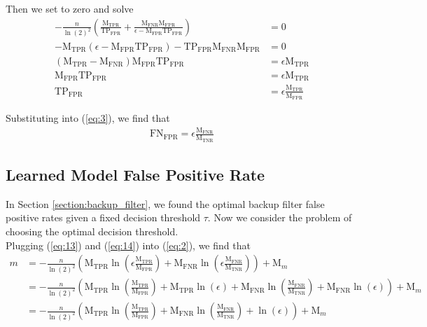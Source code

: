 \documentclass{article}
\begin{document}
\noindent
Then we set to zero and solve
\begin{align}
    - \frac{n}{\ln(2)^2} \left( \frac{\text{M}_\text{TPR}} {\text{TP}_\text{FPR}} + \frac{\text{M}_\text{FNR}\text{M}_\text{FPR}}{\epsilon - \text{M}_\text{FPR} \text{TP}_\text{FPR}}\right) &= 0 \\
    -\text{M}_\text{TPR}\left( \epsilon - \text{M}_\text{FPR} \text{TP}_\text{FPR} \right) - \text{TP}_\text{FPR}\text{M}_\text{FNR}\text{M}_\text{FPR} &= 0 \\
    (\text{M}_\text{TPR} - \text{M}_\text{FNR}) \text{M}_\text{FPR} \text{TP}_\text{FPR} &= \epsilon\text{M}_\text{TPR} \\
    \text{M}_\text{FPR} \text{TP}_\text{FPR} &= \epsilon\text{M}_\text{TPR} \\
    \label{eq:13}
    \text{TP}_\text{FPR} &= \epsilon\frac{\text{M}_\text{TPR}}{\text{M}_\text{FPR}}
\end{align}

\noindent
Substituting into (\ref{eq:3}), we find that
\begin{align}
    \label{eq:14}
    \text{FN}_\text{FPR} = \epsilon \frac{\text{M}_\text{FNR}}{\text{M}_\text{TNR}} 
\end{align}

\subsection{Learned Model False Positive Rate}

In Section \ref{section:backup_filter}, we found the optimal backup filter false positive rates given a fixed decision threshold $\tau$. Now we consider the problem of choosing the optimal decision threshold. \\

\noindent
Plugging (\ref{eq:13}) and (\ref{eq:14}) into (\ref{eq:2}), we find that
\begin{align}
    m &= - \frac{n}{\ln(2)^2}\left( \text{M}_\text{TPR} \ln \left( \epsilon\frac{\text{M}_\text{TPR}}{\text{M}_\text{FPR}} \right) + \text{M}_\text{FNR} \ln \left( \epsilon \frac{\text{M}_\text{FNR}}{\text{M}_\text{TNR}} \right)  \right) + \text{M}_m \\
    &= - \frac{n}{\ln(2)^2}\left( \text{M}_\text{TPR} \ln \left( \frac{\text{M}_\text{TPR}}{\text{M}_\text{FPR}} \right) 
    + \text{M}_\text{TPR} \ln(\epsilon) + \text{M}_\text{FNR} \ln \left( \frac{\text{M}_\text{FNR}}{\text{M}_\text{TNR}}\right)  + \text{M}_\text{FNR} \ln(\epsilon)   \right) + \text{M}_m \\
    &= - \frac{n}{\ln(2)^2}\left( \text{M}_\text{TPR} \ln \left( \frac{\text{M}_\text{TPR}}{\text{M}_\text{FPR}} \right) 
 + \text{M}_\text{FNR} \ln \left( \frac{\text{M}_\text{FNR}}{\text{M}_\text{TNR}}\right) + \ln(\epsilon)   \right) + \text{M}_m
\end{align}
\end{document}
